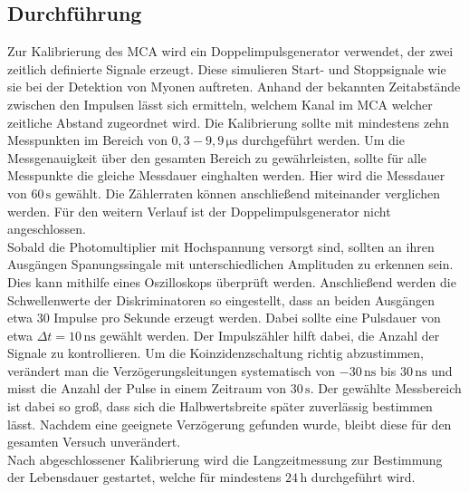 \subsection{Durchführung}
\label{sec:Durchführung}
Zur Kalibrierung des MCA wird ein Doppelimpulsgenerator verwendet, der zwei zeitlich definierte Signale erzeugt. Diese simulieren Start- und Stoppsignale wie sie bei der Detektion von Myonen auftreten. 
Anhand der bekannten Zeitabstände zwischen den Impulsen lässt sich ermitteln, welchem Kanal im MCA welcher zeitliche Abstand zugeordnet wird.
Die Kalibrierung sollte mit mindestens zehn Messpunkten im Bereich von $0,3 - 9,9 \,\unit{\micro\second}$ durchgeführt werden. 
Um die Messgenauigkeit über den gesamten Bereich zu gewährleisten, sollte für alle Messpunkte die gleiche Messdauer einghalten werden. Hier wird die Messdauer von $60\,\unit{\second}$ gewählt.
Die Zählerraten können anschließend miteinander verglichen werden. Für den weitern Verlauf ist der Doppelimpulsgenerator nicht angeschlossen.\\
Sobald die Photomultiplier mit Hochspannung versorgt sind, sollten an ihren Ausgängen Spanungssingale mit unterschiedlichen Amplituden zu erkennen sein.
Dies kann mithilfe eines Oszilloskops überprüft werden.
Anschließend werden die Schwellenwerte der Diskriminatoren so eingestellt, dass an beiden Ausgängen etwa 30 Impulse pro Sekunde erzeugt werden. Dabei sollte eine
Pulsdauer von etwa $\Delta t = 10\,\unit{\nano\second}$ gewählt werden. Der Impulszähler hilft dabei, die Anzahl der Signale zu kontrollieren. Um die Koinzidenzschaltung richtig abzustimmen,
verändert man die Verzögerungsleitungen systematisch von $-30 \, \unit{\nano\second}$ bis $30 \, \unit{\nano\second}$ und misst die Anzahl der Pulse in einem Zeitraum von $30 \, \unit{\second}$. Der gewählte Messbereich
ist dabei so groß, dass sich die Halbwertsbreite später zuverlässig bestimmen lässt. Nachdem eine geeignete Verzögerung gefunden wurde, bleibt diese für den gesamten Versuch unverändert.\\
Nach abgeschlossener Kalibrierung wird die Langzeitmessung zur Bestimmung der Lebensdauer gestartet, welche für mindestens $24\,\unit{\hour}$ durchgeführt wird.
